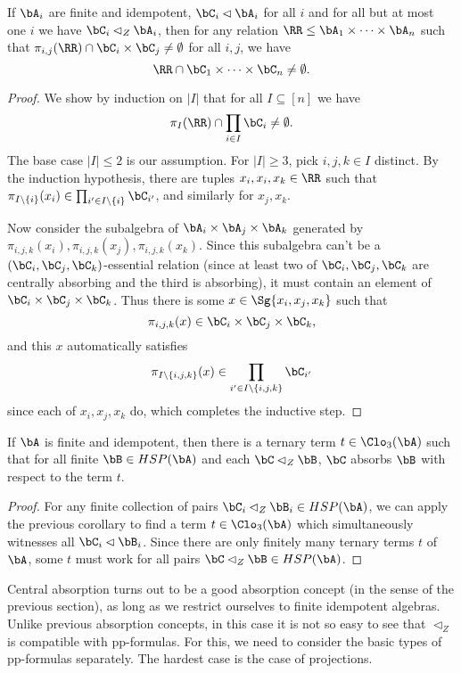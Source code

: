 \begin{cor} If $\bA_i$ are finite and idempotent, $\bC_i \lhd \bA_i$ for all $i$ and for all but at most one $i$ we have $\bC_i \lhd_Z \bA_i$, then for any relation $\RR \le \bA_1 \times \cdots \times \bA_n$ such that $\pi_{i,j}(\RR) \cap \bC_i \times \bC_j \ne \emptyset$ for all $i,j$, we have
\[
\RR \cap \bC_1 \times \cdots \times \bC_n \ne \emptyset.
\]
\end{cor}
\begin{proof} We show by induction on $|I|$ that for all $I \subseteq [n]$ we have
\[
\pi_I(\RR) \cap \prod_{i \in I} \bC_i \ne \emptyset.
\]
The base case $|I| \le 2$ is our assumption. For $|I| \ge 3$, pick $i,j,k \in I$ distinct. By the induction hypothesis, there are tuples $x_i, x_i, x_k \in \RR$ such that $\pi_{I\setminus\{i\}}(x_i) \in \prod_{i' \in I \setminus\{i\}} \bC_{i'}$, and similarly for $x_j,x_k$.

Now consider the subalgebra of $\bA_i\times \bA_j \times \bA_k$ generated by $\pi_{i,j,k}(x_i), \pi_{i,j,k}(x_j), \pi_{i,j,k}(x_k)$. Since this subalgebra can't be a $(\bC_i,\bC_j,\bC_k)$-essential relation (since at least two of $\bC_i,\bC_j,\bC_k$ are centrally absorbing and the third is absorbing), it must contain an element of $\bC_i\times\bC_j\times\bC_k$. Thus there is some $x \in \Sg\{x_i,x_j,x_k\}$ such that
\[
\pi_{i,j,k}(x) \in \bC_i\times\bC_j\times\bC_k,
\]
and this $x$ automatically satisfies
\[
\pi_{I\setminus\{i,j,k\}}(x) \in \prod_{i' \in I\setminus\{i,j,k\}} \bC_{i'}
\]
since each of $x_i, x_j, x_k$ do, which completes the inductive step.
\end{proof}

\begin{cor}\label{cor-central-ternary} If $\bA$ is finite and idempotent, then there is a ternary term $t \in \Clo_3(\bA)$ such that for all finite $\bB \in HSP(\bA)$ and each $\bC \lhd_Z \bB$, $\bC$ absorbs $\bB$ with respect to the term $t$.
\end{cor}
\begin{proof} For any finite collection of pairs $\bC_i \lhd_Z \bB_i \in HSP(\bA)$, we can apply the previous corollary to find a term $t \in \Clo_3(\bA)$ which simultaneously witnesses all $\bC_i \lhd \bB_i$. Since there are only finitely many ternary terms $t$ of $\bA$, some $t$ must work for all pairs $\bC \lhd_Z \bB \in HSP(\bA)$.
\end{proof}

Central absorption turns out to be a good absorption concept (in the sense of the previous section), as long as we restrict ourselves to finite idempotent algebras. Unlike previous absorption concepts, in this case it is not so easy to see that $\lhd_Z$ is compatible with pp-formulas. For this, we need to consider the basic types of pp-formulas separately. The hardest case is the case of projections.

